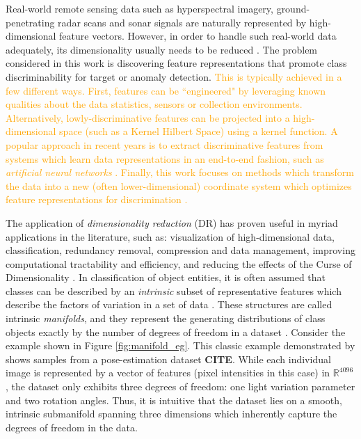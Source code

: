 Real-world remote sensing data such as hyperspectral imagery, ground-penetrating radar scans and sonar signals are naturally represented by high-dimensional feature vectors.  However, in order to handle such real-world data adequately, its dimensionality usually needs to be reduced \citep{VanDerMaaten2009DRReview,Belkin2004SemiSupLearningRiemannianManifolds}. The problem considered in this work is discovering feature representations that promote class discriminability for target or anomaly detection.  \textcolor{orange}{This is typically achieved in a few different ways.  First, features can be ``engineered" by leveraging known qualities about the data statistics, sensors or collection environments.  Alternatively, lowly-discriminative features can be projected into a high-dimensional space (such as a Kernel Hilbert Space) using a kernel function.  A popular approach in recent years is to extract discriminative features from systems which learn data representations in an end-to-end fashion, such as \textit{artificial neural networks} \citep{Tschannen2018RecentAdvancesAutoencoder,Chen2019DeepAutoencoders,Kosiorek2019StackedCapsuleAutoencoders}.  Finally, this work focuses on methods which transform the data into a new (often lower-dimensional) coordinate system which optimizes feature representations for discrimination \citep{Vural2018StudySupervisedManifoldLearning}.}


The application of \textit{dimensionality reduction} (DR) has proven useful in myriad applications in the literature, such as: visualization of high-dimensional data, classification, redundancy removal, compression and data management, improving computational tractability and efficiency, and reducing the effects of the Curse of Dimensionality \citep{Bishop1998GTM,Nickel2017PoincareEmbeddings,Talmon2015ManifoldLearningInDynamicalSystems,Tenenbaum2000Isomap, Geng2005SupNonlinearDimRed, Palomo2017GHNG, Kohonen1990SOM,Kegl2008PrincipalManifoldsTextbook,Bengio2014RepLearningReview}.  In classification of object entities, it is often assumed that classes can be described by an \textit{intrinsic} subset of representative features which describe the factors of variation in a set of data \citep{Belkin2006ManReg}. These structures are called intrinsic \textit{manifolds}, and they represent the generating distributions of class objects exactly by the number of degrees of freedom in a dataset \citep{Thorstensen2009ManifoldThesis, Belkin2004SemiSupLearningRiemannianManifolds}.     Consider the example shown in Figure \ref{fig:manifold_eg}.  This classic example demonstrated by \cite{Thorstensen2009ManifoldThesis} shows samples from a pose-estimation dataset \textbf{CITE}.  While each individual image is represented by a vector of features (pixel intensities in this case) in $\mathbb{R}^{4096}$, the dataset only exhibits three degrees of freedom: one light variation parameter and two rotation angles.  Thus, it is intuitive that the dataset lies on a smooth, intrinsic submanifold spanning three dimensions which inherently capture the degrees of freedom in the data.

